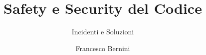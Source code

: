 \documentclass{acm_proc_article-sp}
\begin{document}

\title{Safety e Security del Codice}
\subtitle{Incidenti e Soluzioni}
%
%
%
%
%

%
\author{
%
%
\alignauthor
Francesco Bernini\\
       \\
}

\maketitle
\begin{abstract}

\end{abstract}
\end{document}
